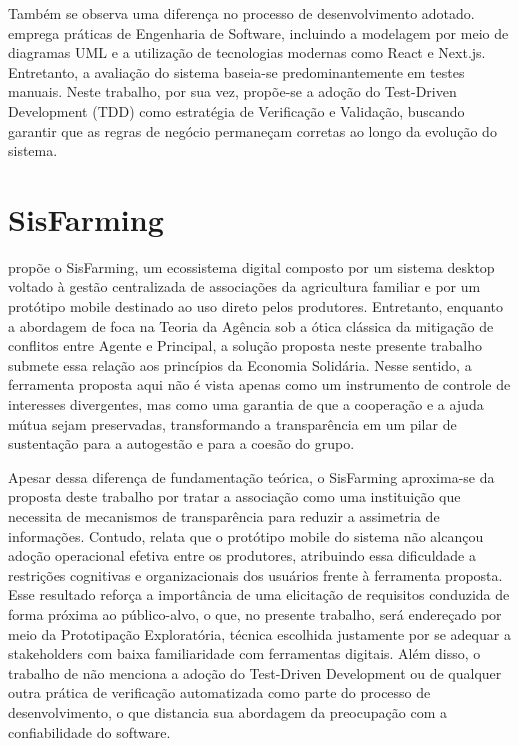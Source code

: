 Também se observa uma diferença no processo de desenvolvimento adotado.  emprega práticas de Engenharia de Software, incluindo a modelagem por meio de diagramas UML e a utilização de tecnologias modernas como React e Next.js. Entretanto, a avaliação do sistema baseia-se predominantemente em testes manuais. Neste trabalho, por sua vez, propõe-se a adoção do Test-Driven Development (TDD) como estratégia de Verificação e Validação, buscando garantir que as regras de negócio permaneçam corretas ao longo da evolução do sistema.


\section{SisFarming}
\label{sec:sisfarming}

 propõe o SisFarming, um ecossistema digital composto por um sistema desktop voltado à gestão centralizada de associações da agricultura familiar e por um protótipo mobile destinado ao uso direto pelos produtores. Entretanto, enquanto a abordagem de  foca na Teoria da Agência sob a ótica clássica da mitigação de conflitos entre Agente e Principal, a solução proposta neste presente trabalho submete essa relação aos princípios da Economia Solidária. Nesse sentido, a ferramenta proposta aqui não é vista apenas como um instrumento de controle de interesses divergentes, mas como uma garantia de que a cooperação e a ajuda mútua sejam preservadas, transformando a transparência em um pilar de sustentação para a autogestão e para a coesão do grupo.

Apesar dessa diferença de fundamentação teórica, o SisFarming aproxima-se da proposta deste trabalho por tratar a associação como uma instituição que necessita de mecanismos de transparência para reduzir a assimetria de informações. Contudo,  relata que o protótipo mobile do sistema não alcançou adoção operacional efetiva entre os produtores, atribuindo essa dificuldade a restrições cognitivas e organizacionais dos usuários frente à ferramenta proposta. Esse resultado reforça a importância de uma elicitação de requisitos conduzida de forma próxima ao público-alvo, o que, no presente trabalho, será endereçado por meio da Prototipação Exploratória, técnica escolhida justamente por se adequar a stakeholders com baixa familiaridade com ferramentas digitais. Além disso, o trabalho de  não menciona a adoção do Test-Driven Development ou de qualquer outra prática de verificação automatizada como parte do processo de desenvolvimento, o que distancia sua abordagem da preocupação com a confiabilidade do software.


